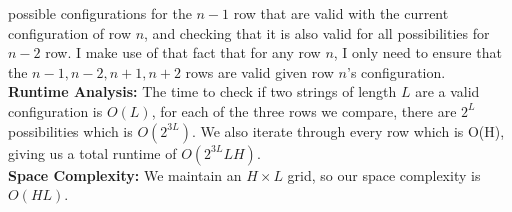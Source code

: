 \documentclass[11pt]{article}
\begin{document}
\begin{solution}
    possible configurations for the $n-1$ row that are valid with the current configuration of row $n$, and checking that it is also valid for 
    all possibilities for $n-2$ row. I make use of that fact that for any row $n$, I only need to ensure that the $n-1, n-2, n+1, n+2$ rows are valid given row $n$'s configuration.\\
    \textbf{Runtime Analysis:} The time to check if two strings of length $L$ are a valid configuration is $O(L)$, for each of the three rows we compare, there are $2^L$ possibilities which is 
    $O(2^{3L})$. We also iterate through every row which is O(H), giving us a total runtime of $O(2^{3L}LH)$.\\
    \textbf{Space Complexity:} We maintain an $H \times L$ grid, so our space complexity is $O(HL)$.
\end{solution}
\end{document}
